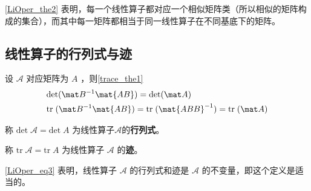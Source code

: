 \autoref{LiOper_the2} 表明，每一个线性算子都对应一个相似矩阵类（所以相似的矩阵构成的集合），而其中每一矩阵都相当于同一线性算子在不同基底下的矩阵。
\subsection{线性算子的行列式与迹}\label{LiOper_sub2}
设 $\mathcal{A}$ 对应矩阵为 $A$ ，则\autoref{trace_the1}~ 
\begin{equation}\label{LiOper_eq3}
\begin{aligned}
&\mathrm{det}(\mat B^{-1}\mat{AB})=\mathrm{det}(\mat A)\\
&\mathrm{tr}\;(\mat B^{-1}\mat{AB})=\mathrm{tr}\;(\mat{ABB}^{-1})=\mathrm{tr}\;(\mat A)
\end{aligned}
\end{equation}
\begin{definition}{}
称
$
\mathrm{det}\;\mathcal{A}=\mathrm{det}\;A
$
为线性算子$\mathcal{A}$的\textbf{行列式}。

称
$
\mathrm{tr}\;\mathcal{A}=\mathrm{tr}\;A
$
为线性算子 $\mathcal{A}$ 的\textbf{迹}。
\end{definition}
\autoref{LiOper_eq3} 表明，线性算子 $\mathcal{A}$ 的行列式和迹是 $\mathcal{A}$ 的不变量，即这个定义是适当的。
